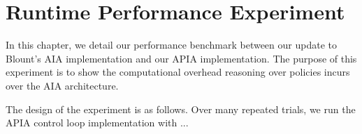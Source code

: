 \chapter{Runtime Performance Experiment}

%

In this chapter, we detail our performance benchmark between our update to Blount's AIA implementation and our APIA implementation.
The purpose of this experiment is to show the computational overhead reasoning over policies incurs over the AIA architecture.

The design of the experiment is as follows.
Over many repeated trials, we run the APIA control loop implementation with ...